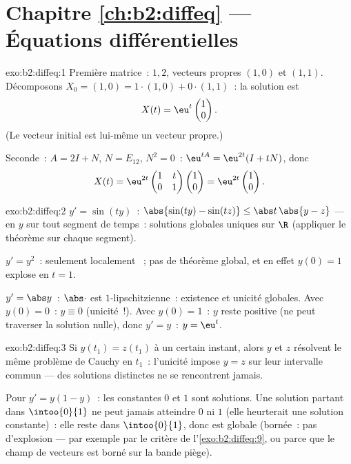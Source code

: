 \section*{Chapitre \ref{ch:b2:diffeq} --- Équations différentielles}

\begin{solution}{exo:b2:diffeq:1}
Première matrice~:  $1, 2$, vecteurs propres $(1,0)$
et $(1,1)$. Décomposons $X_0 = (1,0) = 1\cdot(1,0) + 0\cdot(1,1)$~:
la solution est
\[
X(t) = \eu^{t}\begin{pmatrix}1\\ 0\end{pmatrix} .
\]
(Le vecteur initial est lui-même un vecteur propre.)

Seconde~: $A = 2I + N$, $N = E_{12}$, $N^2 = 0$~: $\eu^{tA} =
\eu^{2t}(I + tN)$, donc
\[
X(t) = \eu^{2t}\begin{pmatrix} 1 & t\\ 0 & 1\end{pmatrix}
\begin{pmatrix}1\\ 0\end{pmatrix}
= \eu^{2t}\begin{pmatrix}1\\ 0\end{pmatrix}.
\]
\end{solution}

\begin{solution}{exo:b2:diffeq:2}
$y' = \sin(ty)$~: $\abs{\sin(ty) - \sin(tz)} \leq \abs t\,\abs{y -
z}$ ---  en $y$  sur tout segment de
temps~: solutions globales uniques sur $\R$ (appliquer le théorème
sur chaque segment).

$y' = y^2$~: seulement localement ~; pas de théorème
global, et en effet $y(0) = 1$ explose en $t = 1$.

$y' = \abs y$~: $\abs\cdot$ est $1$-lipschitzienne~: existence et
unicité globales. Avec $y(0) = 0$~: $y \equiv 0$ (unicité~!). Avec
$y(0) = 1$~: $y$ reste positive (ne peut traverser la solution
nulle), donc $y' = y$~: $y = \eu^t$.
\end{solution}

\begin{solution}{exo:b2:diffeq:3}
Si $y(t_1) = z(t_1)$ à un certain instant, alors $y$ et $z$
résolvent le même problème de Cauchy en $t_1$~: l'unicité impose $y
= z$ sur leur intervalle commun --- des solutions distinctes ne se
rencontrent jamais.

Pour $y' = y(1-y)$~: les constantes $0$ et $1$ sont solutions. Une
solution partant dans $\intoo{0}{1}$ ne peut jamais atteindre $0$
ni $1$ (elle heurterait une solution constante)~: elle reste dans
$\intoo{0}{1}$, donc est globale (bornée~: pas d'explosion --- par
exemple par le critère de l'\cref{exo:b2:diffeq:9}, ou parce que le
champ de vecteurs est borné sur la bande piège).
\end{solution}

